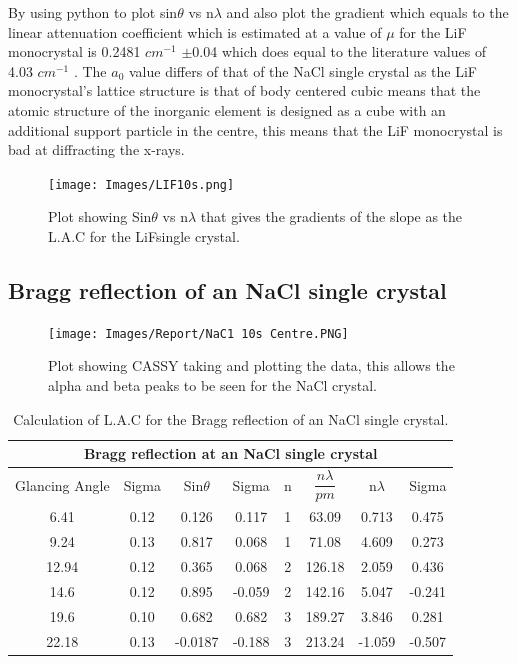 \documentclass[12pt]{article}
\begin{document}
By using python to plot sin$\theta$ vs n$\lambda$ and also plot the gradient which equals to the linear attenuation coefficient which is estimated at a value of $\mu$ for the LiF monocrystal is 0.2481 $cm^{-1}$ $\pm$0.04 which does equal to the literature values of 4.03 $cm^{-1}$ \cite{CRC}. The $a_0$ value differs of that of the NaCl single crystal as the LiF monocrystal's lattice structure is that of body centered cubic means that the atomic structure of the inorganic element is designed as a cube with an additional support particle in the centre, this means that the LiF monocrystal is bad at diffracting the x-rays.

\begin{figure}[H]
\centering
\texttt{[image: Images/LIF10s.png]}
\caption{Plot showing Sin$\theta$ vs n$\lambda$ that gives the gradients of the slope as the L.A.C for the LiFsingle crystal.}
\label{LiF graph 1}
\end{figure}

\subsection{Bragg reflection of an NaCl single crystal}
\label{Bragg reflection of an NaCl single crystal SubSection}

\begin{figure}[H]
\centering
\texttt{[image: Images/Report/NaC1 10s Centre.PNG]}
\caption{Plot showing CASSY taking and plotting the data, this allows the alpha and beta peaks to be seen for the NaCl crystal.}
\label{NaCl graph}
\end{figure}


\begin{table}[H]
\begin{center}
 \footnotesize
 \begin{tabular}{|c|c||c|c||c||c|c|c|}
 \hline
 \multicolumn{8}{|c|}{Bragg reflection at an NaCl single crystal} \\
 \hline 
 Glancing Angle & Sigma & Sin$\theta$ & Sigma & n & $\dfrac{n\lambda}{pm}$ & n$\lambda$ & Sigma\\
 \hline \hline
  6.41 & 0.12 & 0.126 & 0.117 & 1 & 63.09 & 0.713 & 0.475 \\
  \hline
  9.24 & 0.13 & 0.817 & 0.068 & 1 & 71.08 & 4.609 & 0.273 \\
 \hline 
 12.94 & 0.12 & 0.365 & 0.068 & 2 & 126.18 & 2.059 & 0.436 \\
 \hline
  14.6 & 0.12 & 0.895 & -0.059 & 2 & 142.16 & 5.047 & -0.241\\
 \hline 
  19.6 & 0.10 & 0.682 & 0.682 & 3 & 189.27 & 3.846 & 0.281\\
 \hline
  22.18 & 0.13 & -0.0187 & -0.188 & 3 & 213.24 & -1.059 & -0.507 \\
 \hline
 \end{tabular} \\ 
 \caption{Calculation of L.A.C for the Bragg reflection of an NaCl single crystal.}
 \label{Bragg NaCl Reflection}
\end{center}
\end{table}
\end{document}
